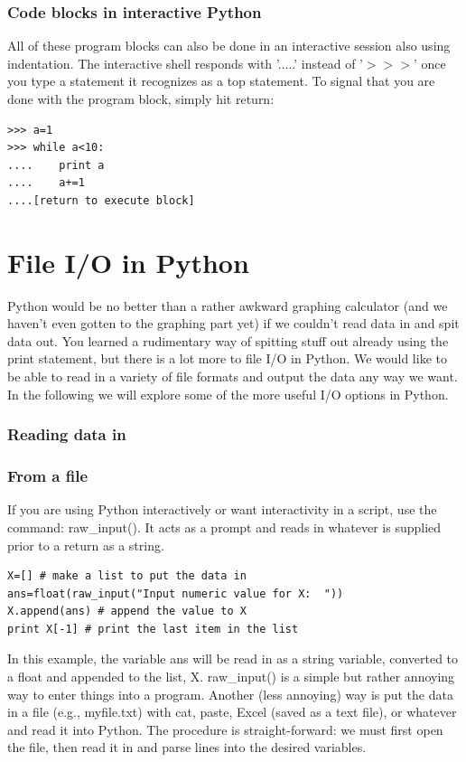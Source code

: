 \documentclass[11pt]{book}
\begin{document}
{{{\subsubsection{Code blocks in interactive Python}

All of these program blocks can also be done in an interactive session also using indentation.  The interactive shell responds with '.....'  instead of '$>>>$' once you type a statement it recognizes as a top statement.   To signal that you are done with the program block, simply hit return: 


{ \color{blue} \begin{verbatim}
>>> a=1
>>> while a<10:
....    print a
....    a+=1
....[return to execute block]
\end{verbatim}}



\section{File I/O in Python}

Python would be no better than a rather awkward graphing calculator (and we haven't even gotten to the graphing part yet) if we couldn't read data in and spit data out.   You learned a rudimentary way of spitting stuff out already using the {\color{blue}print} statement, but there is a lot more to file I/O in Python.  We would like to be able to read in a variety of file formats  and output the data any way we want.  In the following we will explore some of the more useful  I/O options in Python.  




\subsubsection{Reading data in}
\subsubsection{From a file}

If you are using Python interactively or want interactivity in a script,  use the command:  {\color{blue}raw\_input()}.  It acts as a prompt and reads in whatever is supplied prior to a return as a string.  

{ \color{blue} \begin{verbatim}
X=[] # make a list to put the data in
ans=float(raw_input("Input numeric value for X:  ")) 
X.append(ans) # append the value to X
print X[-1] # print the last item in the list
\end{verbatim}}
\noindent
In this example, the variable {\color{blue}ans} will be read in as a string variable,  converted to a float and appended to the list, {\color{blue}X}.    {\color{blue}raw\_input()} is a simple but rather annoying way to enter things into a program.  
Another (less annoying)  way is  put the data in a file (e.g., myfile.txt) with cat, paste, Excel (saved as a text file), or whatever and read  it into Python.  The procedure is straight-forward: we must first open the file, then read it in and parse lines into the desired variables.  

}}}
\end{document}
